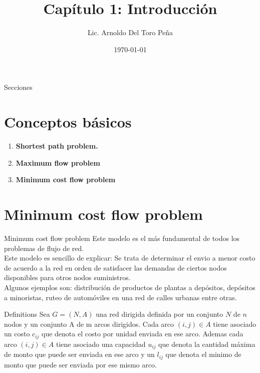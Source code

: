 \documentclass{beamer}
\title{Capítulo 1: Introducción}
\author{Lic. Arnoldo Del Toro Peña}
\institute{ \color{blue}{\Large Universidad Autonoma de Nuevo Leon}}
\date{\today}
\begin{document}
\begin{frame}
 \titlepage
\end{frame}

\begin{frame}{Secciones}
 \tableofcontents
\end{frame}

\section{Conceptos básicos}
\begin{frame}

 \begin{enumerate}
  \item \bfseries{Shortest path problem.}
  \item \bfseries{Maximum flow problem}
  \item \bfseries{Minimum cost flow problem}
 \end{enumerate}
\end{frame}

\section{Minimum cost flow problem}

\begin{frame}{Minimum cost flow problem}
 Este modelo es el más fundamental de todos los problemas de flujo de red. \\ 
 Este modelo es sencillo de explicar: Se trata de determinar el envio a menor costo de acuerdo a la red en orden de satisfacer las demandas de ciertos nodos disponibles para otros nodos suministros.\\
 Algunos ejemplos son: distribución de productos de plantas a depósitos, depósitos a minoristas, ruteo de automóviles en una red de calles urbanas entre otras.
 
\end{frame}

\begin{frame}{Definitions}
 Sea $G=(N,A)$ una red dirigida definida por un conjunto $N$ de $n$ nodos y un conjunto A de m arcos dirigidos. Cada arco $(i,j) \in A$ tiene asociado un costo $c_{ij}$ que denota el costo por unidad enviada en ese arco. Ademas cada arco $(i,j) \in A$ tiene asociado una capacidad $u_{ij}$ que denota la cantidad máxima de monto que puede ser enviada en ese arco y un $l_{ij}$ que denota el minimo de monto que puede ser enviada por ese mismo arco. 
\end{frame}
\end{document}
